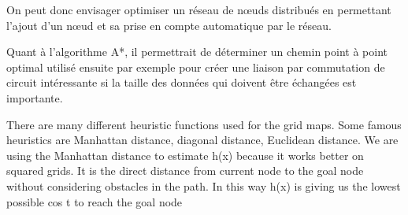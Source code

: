 On peut donc envisager optimiser un réseau de nœuds distribués en permettant l'ajout d'un nœud et sa prise en compte automatique par le réseau.

Quant à l'algorithme A*, il permettrait de déterminer un chemin point à point optimal utilisé ensuite par exemple pour créer une liaison par commutation de circuit intéressante si la taille des données qui doivent être échangées est importante.

There  are  many  different  heuristic  functions  used  for  the  grid  maps.  Some famous  heuristics  are 
Manhattan  distance,  diagonal  distance,  Euclidean  distance.  
We  are  using  the  Manhattan  distance  to  estimate  h(x)  because  it  works  better  on 
squared  grids. It  is  the  direct  distance  from  current  node  to  the  goal  node 
without considering obstacles in the path. In this way h(x) is giving us the lowest 
possible cos
t to reach the goal node






